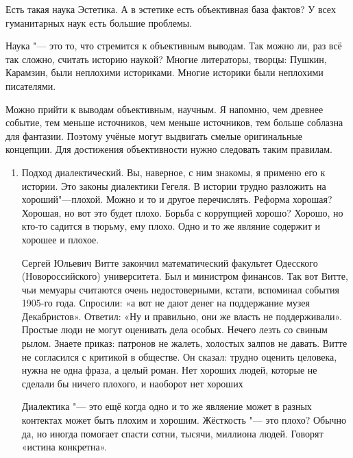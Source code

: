 Есть такая наука Эстетика. А в эстетике есть объективная база фактов? У всех гуманитарных наук есть большие проблемы.

Наука "--- это то, что стремится к объективным выводам. Так можно ли, раз всё так сложно, считать историю наукой? Многие литераторы, творцы: Пушкин, Карамзин, были неплохими историками. Многие историки были неплохими писателями.

Можно прийти к выводам объективным, научным. Я напомню, чем древнее событие, тем меньше источников, чем меньше источников, тем больше соблазна для фантазии. Поэтому учёные могут выдвигать смелые оригинальные концепции. Для достижения объективности нужно следовать таким правилам.
\begin{enumerate}
\item Подход диалектический. Вы, наверное, с ним знакомы, я применю его к истории. Это законы диалектики Гегеля. В истории трудно разложить на хороший"---плохой. Можно и то и другое перечислять. Реформа хорошая? Хорошая, но вот это будет плохо. Борьба с коррупцией хорошо? Хорошо, но кто-то садится в тюрьму, ему плохо. Одно и то же являние содержит и хорошее и плохое.

Сергей Юльевич Витте закончил математический факультет Одесского (Новороссийского) университета. Был и министром финансов. Так вот Витте, чьи мемуары считаются очень недостоверными, кстати, вспоминал события 1905-го года. Спросили: «а вот не дают денег на поддержание музея Декабристов». Ответил: «Ну и правильно, они же власть не поддерживали». Простые люди не могут оценивать дела особых. Нечего лезть со свиным рылом. Знаете приказ: патронов не жалеть, холостых залпов не давать. Витте не согласился с критикой в обществе. Он сказал: трудно оценить целовека, нужна не одна фраза, а целый роман. Нет хороших людей, которые не сделали бы ничего плохого, и наоборот нет хороших\ldotst

Диалектика "--- это ещё когда одно и то же являение может в разных контектах может быть плохим и хорошим. Жёсткость "--- это плохо? Обычно да, но иногда помогает спасти сотни, тысячи, миллиона людей. Говорят «истина конкретна».
\end{enumerate}
